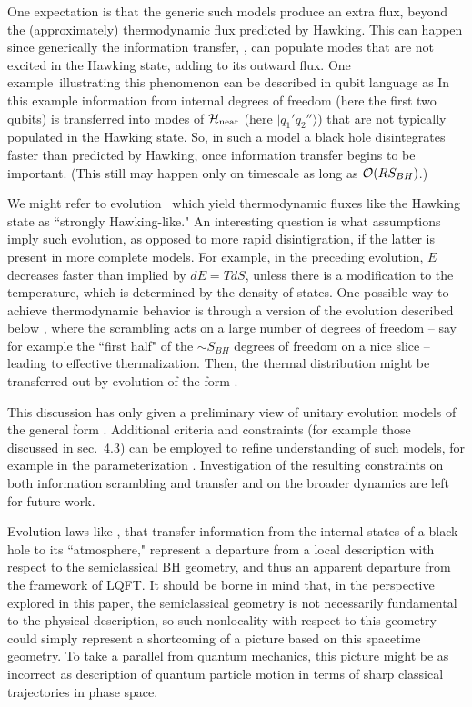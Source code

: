 One expectation is that the generic such models produce an extra flux, beyond the (approximately) thermodynamic flux predicted by Hawking.  This can happen since generically the information transfer, \hawkmodt,  can populate modes that are not excited in the Hawking state, adding to its outward flux.  One example\ModelsU\ illustrating this phenomenon can be described in qubit language as 
%
\eqn{}
%
In this example information from internal degrees of freedom (here  the first two qubits) is transferred into modes of ${{\cal H}_{\rm near}}$ (here $|q_1'q_2''\rangle$) that are not typically populated in the Hawking state.  So, in such a model a black hole disintegrates faster than predicted by Hawking, once information transfer begins to be important.  (This still may happen only on timescale as long as ${\cal O}(RS_{BH})$.)

We might refer to evolution \hbhcomb\ which yield thermodynamic fluxes like the Hawking state as ``strongly Hawking-like."  An interesting question is what assumptions imply such evolution, as opposed to more rapid disintigration, if  the latter is present in more complete models. For example, in the preceding evolution, $E$ decreases faster than implied by $dE=T dS$, unless there is a modification to the temperature, which is determined by the density of states. One possible way to achieve thermodynamic behavior is through a version of  the evolution described below \evoltwo, where the scrambling acts on a large number of degrees of freedom -- say for example the ``first half" of the $\sim S_{BH}$ degrees of freedom on a nice slice -- leading to effective thermalization.  Then, the thermal distribution might be transferred out by evolution of the form \evoltwo.


This discussion has only given a preliminary view of unitary evolution models of the general form \hbhcomb.  Additional criteria and constraints (for example those discussed in sec.~4.3) can be employed to refine understanding of such models, for example in the parameterization \hawkmodt.    Investigation of the resulting constraints on both information scrambling and transfer and on the broader dynamics are left for future work.



Evolution laws like \hbhcomb, that transfer information from the internal states of a black hole to its ``atmosphere," represent a departure from a local description with respect to the semiclassical BH geometry, and thus an apparent departure from the framework of LQFT.  It should be borne in mind that, in the perspective explored in this paper, the semiclassical  geometry is not necessarily fundamental to the physical description, so such nonlocality with respect to this geometry could simply represent a shortcoming of a picture based on this spacetime geometry.  To take a parallel from quantum mechanics, this picture might be as incorrect as description of quantum particle motion in terms of sharp classical trajectories in phase space.

